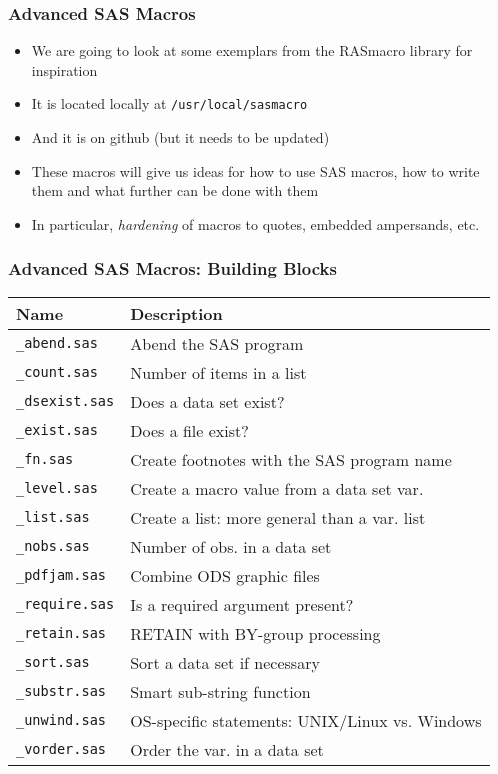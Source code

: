 \documentclass[11pt,pdftex,dvipsnames,usenames,helvetica]{beamer}
\begin{document}
\begin{frame}[fragile]
\frametitle{Advanced SAS Macros}
\begin{itemize}
\item We are going to look at some exemplars from the RASmacro
library for inspiration
\item It is located locally at {\tt /usr/local/sasmacro}
\item And it is on github (but it needs to be updated)
\item These macros will give us ideas for how to use
SAS macros, how to write them and what further can be
done with them
\item In particular, {\it hardening} of macros to
quotes, embedded ampersands, etc.
\end{itemize}

\end{frame}

\begin{frame}[fragile]
\frametitle{Advanced SAS Macros: Building Blocks}
\begin{center}
\begin{tabular}{ll}
Name               & Description \\ \hline
{\tt \_abend.sas}  & Abend the SAS program \\
{\tt \_count.sas}  & Number of items in a list \\
{\tt \_dsexist.sas}& Does a data set exist? \\
{\tt \_exist.sas}  & Does a file exist? \\
{\tt \_fn.sas}     & Create footnotes with the SAS program name \\
{\tt \_level.sas}  & Create a macro value from a data set var.\\
{\tt \_list.sas}   & Create a list: more general than a var. list \\
{\tt \_nobs.sas}   & Number of obs. in a data set \\
{\tt \_pdfjam.sas} & Combine ODS graphic files \\
{\tt \_require.sas}& Is a required argument present? \\
{\tt \_retain.sas} & RETAIN with BY-group processing\\
{\tt \_sort.sas}   & Sort a data set if necessary \\
{\tt \_substr.sas} & Smart sub-string function \\
{\tt \_unwind.sas} & OS-specific statements: UNIX/Linux vs. Windows \\
{\tt \_vorder.sas} & Order the var. in a data set\\
\end{tabular}
\end{center}
\end{frame}
\end{document}
